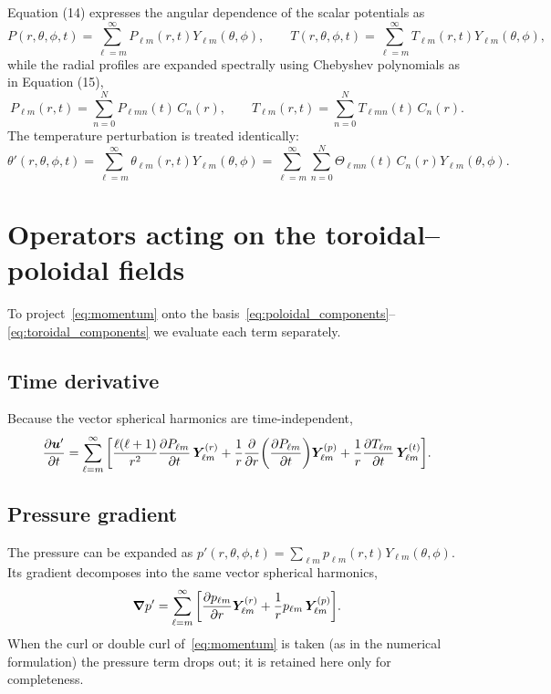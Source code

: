 \documentclass[11pt]{article}
\numberwithin{equation}{section}
\begin{document}
Equation (14) expresses the angular dependence of the scalar potentials as
\begin{equation}
  P(r,\theta,\phi,t) = \sum_{\ell=m}^{\infty} P_{\ell m}(r,t) Y_{\ell m}(\theta,\phi), \qquad
  T(r,\theta,\phi,t) = \sum_{\ell=m}^{\infty} T_{\ell m}(r,t) Y_{\ell m}(\theta,\phi),
  \label{eq:sph_expansion}
\end{equation}
while the radial profiles are expanded spectrally using Chebyshev polynomials as in Equation (15),
\begin{equation}
  P_{\ell m}(r,t) = \sum_{n=0}^{N} P_{\ell m n}(t) \, C_n(r), \qquad
  T_{\ell m}(r,t) = \sum_{n=0}^{N} T_{\ell m n}(t) \, C_n(r).
  \label{eq:chebyshev_expansion}
\end{equation}
The temperature perturbation is treated identically:
\begin{equation}
  \theta'(r,\theta,\phi,t) = \sum_{\ell=m}^{\infty} \theta_{\ell m}(r,t) Y_{\ell m}(\theta,\phi)
  = \sum_{\ell=m}^{\infty} \sum_{n=0}^{N} \Theta_{\ell m n}(t) \, C_n(r) Y_{\ell m}(\theta,\phi).
  \label{eq:theta_expansion}
\end{equation}

\section{Operators acting on the toroidal--poloidal fields}
To project~\eqref{eq:momentum} onto the basis~\eqref{eq:poloidal_components}--\eqref{eq:toroidal_components} we evaluate each term separately.

\subsection{Time derivative}
Because the vector spherical harmonics are time-independent,
\begin{equation}
  \pdv{\bm{u}'}{t}
  = \sum_{\ell=m}^{\infty} \qty[
       \frac{\ell (\ell+1)}{r^2} \pdv{P_{\ell m}}{t} \, \bm{Y}_{\ell m}^{(r)}
       + \frac{1}{r} \pdv{}{r} \qty(\pdv{P_{\ell m}}{t}) \bm{Y}_{\ell m}^{(p)}
       + \frac{1}{r} \pdv{T_{\ell m}}{t} \, \bm{Y}_{\ell m}^{(t)}
  ].
  \label{eq:time_term}
\end{equation}

\subsection{Pressure gradient}
The pressure can be expanded as $p'(r,\theta,\phi,t) = \sum_{\ell m} p_{\ell m}(r,t) Y_{\ell m}(\theta,\phi)$. Its gradient decomposes into the same vector spherical harmonics,
\begin{equation}
  \grad p' = \sum_{\ell=m}^{\infty} \qty[
      \pdv{p_{\ell m}}{r} \bm{Y}_{\ell m}^{(r)}
      + \frac{1}{r} p_{\ell m} \, \bm{Y}_{\ell m}^{(p)}
  ].
  \label{eq:pressure_term}
\end{equation}
When the curl or double curl of~\eqref{eq:momentum} is taken (as in the numerical formulation) the pressure term drops out; it is retained here only for completeness.
\end{document}
